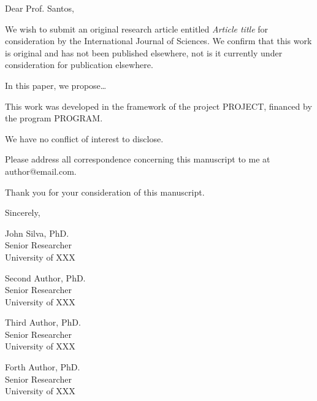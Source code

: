 \documentclass[11pt,a4paper,roman]{moderncv}
\begin{document}
\date{\today}
\opening{Dear Prof. Santos,}
\makelettertitle

\justify
We wish to submit an original research article entitled \textit{Article title}
for consideration by the International Journal of Sciences.  We confirm that
this work is original and has not been published elsewhere, not is it currently
under consideration for publication elsewhere.

In this paper, we propose\ldots

This work was developed in the framework of the project PROJECT, financed by
the program PROGRAM.

We have no conflict of interest to disclose.

Please address all correspondence concerning this manuscript to me at
author@email.com.

\vspace{0.5cm}

Thank you for your consideration of this manuscript.

\vspace{0.5cm}

Sincerely,

\vspace{0.5cm}

\begin{minipage}[t]{0.45\linewidth}
John Silva, PhD. \\
Senior Researcher \\
University of XXX
\end{minipage}
\hfill
\begin{minipage}[t]{0.45\linewidth}
Second Author, PhD. \\
Senior Researcher \\
University of XXX
\end{minipage}

\vspace{0.5cm}

\begin{minipage}[t]{0.45\linewidth}
Third Author, PhD. \\
Senior Researcher \\
University of XXX
\end{minipage}
\hfill
\begin{minipage}[t]{0.45\linewidth}
Forth Author, PhD. \\
Senior Researcher \\
University of XXX
\end{minipage}
\end{document}
